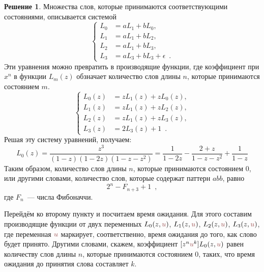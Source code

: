 \documentclass[a5paper]{article}
\theoremstyle{definition}
\newtheorem*{solution}{Решение}
\begin{document}
\begin{solution}
Множества слов, которые принимаются соответствующими состояниями, описывается
системой
\begin{equation}
\begin{cases}
    L_0 &= a L_1 + b L_0 ,\\
    L_1 &= a L_1 + b L_2 ,\\
    L_2 &= a L_1 + b L_3 ,\\
    L_3 &= a L_3 + b L_3 + \epsilon \enspace.
\end{cases}
\end{equation}
Эти уравнения можно превратить в производящие функции, где коэффициент при \(
x^n \) в функции \( L_m(z) \) обзначает количество слов длины \( n \), которые принимаются
состоянием \( m \).
\begin{equation}
\begin{cases}
    L_0(z) &= z L_1(z) + z L_0(z) ,\\
    L_1(z) &= z L_1(z) + z L_2(z) ,\\
    L_2(z) &= z L_1(z) + z L_3(z) ,\\
    L_3(z) &= 2 L_3(z) + 1\enspace.
\end{cases}
\end{equation}
Решая эту систему уравнений, получаем:
\begin{equation}
    L_0(z) = \dfrac{z^3}{(1-z)(1 - 2z)(1 - z - z^2)}
    = \dfrac{1}{1 - 2z} - \dfrac{2+z}{1 - z - z^2} + \dfrac{1}{1-z}
\end{equation}
Таким образом, количество слов длины \( n \), которые принимаются состоянием \(
0 \), или другими словами, количество слов, которые содержат паттерн \(abb \),
  равно                           
\begin{equation}
    2^n - F_{n+3} + 1
    \enspace ,
\end{equation}
где \( F_n \)~--- числа Фибоначчи.

\def\uu{ {\color{blackred}u} }

Перейдём ко второму пункту и посчитаем время ожидания. Для этого составим
производящие функции от двух переменных \( L_0(z,\uu) \),
 \( L_1(z,\uu) \), \( L_2(z,\uu) \), \( L_3(z,\uu) \), где переменная \( \uu \)
маркирует, соответственно, время ожидания до того, как слово будет принято.
Другими словами, скажем,  коэффициент \( [z^n \uu^k]L_0(z, \uu) \) равен
количеству слов длины \( n \), которые принимаются состоянием \( 0 \), таких, что
время ожидания до принятия слова составляет \( k \). 


\end{solution}
\end{document}
